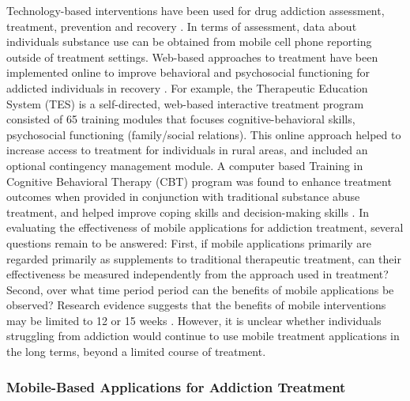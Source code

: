 \documentclass[sigconf]{acmart}
\begin{document}
Technology-based interventions have been used for drug addiction assessment, 
treatment, prevention and recovery \cite{marsch12}. In terms of assessment, data 
about individuals substance use can be obtained from mobile cell phone reporting 
outside of treatment settings. Web-based approaches to treatment have been 
implemented online to improve behavioral and psychosocial functioning for addicted 
individuals in recovery \cite{marschdallery2012}. For example, the Therapeutic 
Education System (TES) is a self-directed, web-based interactive treatment program 
consisted of 65 training modules that  focuses cognitive-behavioral skills, 
psychosocial functioning (family/social relations). This online approach helped 
to increase access to treatment for individuals in rural areas, and included an 
optional contingency management module. A computer based Training in Cognitive 
Behavioral Therapy (CBT) program was found to enhance treatment outcomes when 
provided in conjunction with traditional substance abuse treatment, and helped 
improve coping skills and decision-making skills \cite{carroll08}. In evaluating 
the effectiveness of mobile applications for addiction treatment, several  
questions remain to be answered: First, if mobile applications primarily are
regarded primarily as supplements to traditional therapeutic treatment, can their 
effectiveness be measured independently from the approach used in treatment? 
Second, over what time period period can the benefits of mobile applications be 
observed? Research evidence suggests that the benefits of mobile interventions 
may be limited to 12 or 15 weeks \cite{swedenson16}. However, it is unclear 
whether individuals struggling from addiction would continue to use mobile 
treatment applications in the long terms, beyond a limited course of treatment.


\subsubsection{Mobile-Based Applications for Addiction Treatment}
\end{document}
